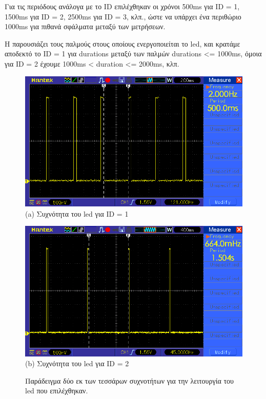 Για τις περιόδους ανάλογα με το ID επιλέχθηκαν οι χρόνοι 500ms για ID = 1, 1500ms για ID = 2, 2500ms για ID = 3, κλπ., ώστε να υπάρχει ένα περιθώριο 1000ms για πιθανά σφάλματα μεταξύ των μετρήσεων. 

Η  παρουσιάζει τους παλμούς στους οποίους ενεργοποιείται το led, και κρατάμε αποδεκτό το ID = 1 για durations μεταξύ των παλμών durations <= 1000ms, όμοια για ID = 2 έχουμε 1000ms < duration <= 2000ms, κλπ.

\begin{figure} [H]
	\centering
    \begin{minipage}{.5\textwidth}
      \centering
      \includegraphics[width=0.9\linewidth]{../Images/Experiments-Results/node-pulses-0_5sec.png}\\
      {(a) Συχνότητα του led για ID = 1}
    \end{minipage}%
    \begin{minipage}{.5\textwidth}
      \centering
      \includegraphics[width=.9\linewidth]{../Images/Experiments-Results/node_pulses_1_5sec.png}\\
      {(b) Συχνότητα του led για ID = 2}
	  \end{minipage}
    \hfill \break
    \decoRule
    \caption[Παράδειγμα δύο εκ των τεσσάρων συχνοτήτων για την λειτουργία του led που επιλέχθηκαν.]{Παράδειγμα δύο εκ των τεσσάρων συχνοτήτων για την λειτουργία του led που επιλέχθηκαν.}%
    \label{fig:id-osci-samples}
\end{figure}

